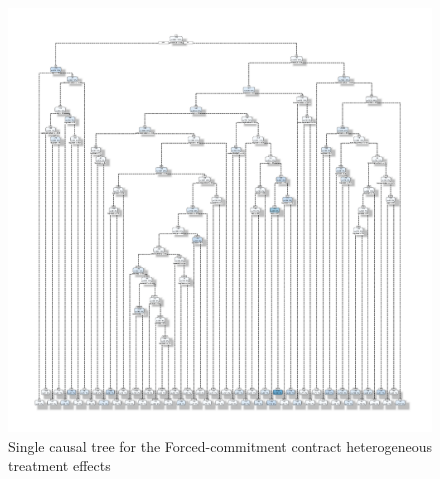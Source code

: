 \begin{figure}[H]
        \caption{Single causal tree for the Forced-commitment contract heterogeneous treatment effects}
    \label{casual_tree}
    \begin{center}
        \centering
        \includegraphics[width=\textwidth]{Figuras/ct_pro_2_apr.pdf}
    \end{center}
    \footnotesize 
   
\end{figure}



    

